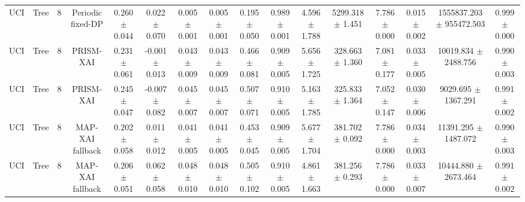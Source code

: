 \begin{tabular}{lccccccccccccccc}
UCI & Tree & 8 & Periodic fixed-DP & 0.260 $\pm$ 0.044 & 0.022 $\pm$ 0.070 & 0.005 $\pm$ 0.001 & 0.005 $\pm$ 0.001 & 0.195 $\pm$ 0.050 & 0.989 $\pm$ 0.001 & 4.596 $\pm$ 1.788 & 5299.318 $\pm$ 1.451 & 7.786 $\pm$ 0.000 & 0.015 $\pm$ 0.002 & 1555837.203 $\pm$ 955472.503 & 0.999 $\pm$ 0.000 \\
UCI & Tree & 8 & PRISM-XAI & 0.231 $\pm$ 0.061 & -0.001 $\pm$ 0.013 & 0.043 $\pm$ 0.009 & 0.043 $\pm$ 0.009 & 0.466 $\pm$ 0.081 & 0.909 $\pm$ 0.005 & 5.656 $\pm$ 1.725 & 328.663 $\pm$ 1.360 & 7.081 $\pm$ 0.177 & 0.033 $\pm$ 0.005 & 10019.834 $\pm$ 2488.756 & 0.990 $\pm$ 0.003 \\
UCI & Tree & 8 & PRISM-XAI & 0.245 $\pm$ 0.047 & -0.007 $\pm$ 0.082 & 0.045 $\pm$ 0.007 & 0.045 $\pm$ 0.007 & 0.507 $\pm$ 0.071 & 0.910 $\pm$ 0.005 & 5.163 $\pm$ 1.785 & 325.833 $\pm$ 1.364 & 7.052 $\pm$ 0.147 & 0.030 $\pm$ 0.006 & 9029.695 $\pm$ 1367.291 & 0.991 $\pm$ 0.002 \\
UCI & Tree & 8 & MAP-XAI fallback & 0.202 $\pm$ 0.058 & 0.011 $\pm$ 0.012 & 0.041 $\pm$ 0.005 & 0.041 $\pm$ 0.005 & 0.453 $\pm$ 0.045 & 0.909 $\pm$ 0.005 & 5.677 $\pm$ 1.704 & 381.702 $\pm$ 0.092 & 7.786 $\pm$ 0.000 & 0.034 $\pm$ 0.003 & 11391.295 $\pm$ 1487.072 & 0.990 $\pm$ 0.003 \\
UCI & Tree & 8 & MAP-XAI fallback & 0.206 $\pm$ 0.051 & 0.062 $\pm$ 0.058 & 0.048 $\pm$ 0.010 & 0.048 $\pm$ 0.010 & 0.505 $\pm$ 0.102 & 0.910 $\pm$ 0.005 & 4.861 $\pm$ 1.663 & 381.256 $\pm$ 0.293 & 7.786 $\pm$ 0.000 & 0.033 $\pm$ 0.007 & 10444.880 $\pm$ 2673.464 & 0.991 $\pm$ 0.002 \\
\bottomrule
\end{tabular}
